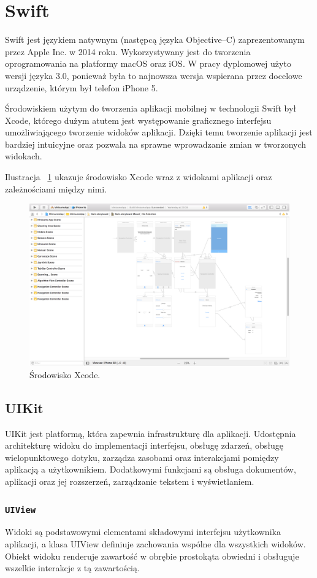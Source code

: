 \section{Swift}
Swift jest językiem natywnym (następcą języka Objective–C) zaprezentowanym przez Apple Inc. w 2014 roku. Wykorzystywany jest do tworzenia oprogramowania na platformy macOS oraz iOS. W pracy dyplomowej użyto wersji języka 3.0, ponieważ była to najnowsza wersja wspierana przez docelowe urządzenie, którym był telefon iPhone 5.

Środowiskiem użytym do tworzenia aplikacji mobilnej w technologii Swift był Xcode, którego dużym atutem jest występowanie graficznego interfejsu umożliwiającego tworzenie widoków aplikacji. Dzięki temu tworzenie aplikacji jest bardziej intuicyjne oraz pozwala na sprawne wprowadzanie zmian w tworzonych widokach.

Ilustracja ~\ref{fig:xcode} ukazuje środowisko Xcode wraz z widokami aplikacji oraz zależnościami między nimi.   

\begin{figure}[H]
	\centering
		\includegraphics[width=0.75\linewidth]{pic02/xcode}
	\caption{Środowisko Xcode.}
	\label{fig:xcode}	
\end{figure}

\subsection{UIKit}
UIKit jest platformą, która zapewnia infrastrukturę dla aplikacji. Udostępnia  architekturę widoku do implementacji interfejsu, obsługę zdarzeń, obsługę wielopunktowego dotyku, zarządza zasobami oraz interakcjami pomiędzy aplikacją a użytkownikiem. Dodatkowymi funkcjami są obsługa dokumentów, aplikacji oraz jej rozszerzeń, zarządzanie tekstem i wyświetlaniem.

 \subsubsection{\lstinline$UIView$}
Widoki są podstawowymi elementami składowymi interfejsu użytkownika aplikacji, a klasa UIView definiuje zachowania wspólne dla wszystkich widoków. Obiekt widoku renderuje zawartość w obrębie prostokąta obwiedni i obsługuje wszelkie interakcje z tą zawartością. 

